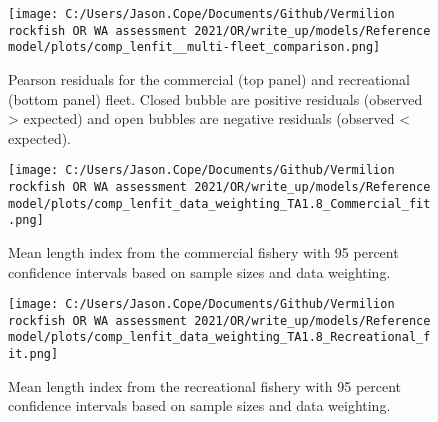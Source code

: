 \documentclass[11pt,
  english,
  a4paper,
]{article}
\begin{document}
\tagmcend\tagstructend


\begin{figure}
\centering
\texttt{[image: C:/Users/Jason.Cope/Documents/Github/Vermilion rockfish OR WA assessment 2021/OR/write\_up/models/Reference model/plots/comp\_lenfit\_\_multi-fleet\_comparison.png]}
\caption{Pearson residuals for the commercial (top panel) and recreational (bottom panel) fleet. Closed bubble are positive residuals (observed \textgreater{} expected) and open bubbles are negative residuals (observed \textless{} expected).\label{fig:com-rec-pearson}}
\end{figure}

\tagmcend\tagstructend


\begin{figure}
\centering
\texttt{[image: C:/Users/Jason.Cope/Documents/Github/Vermilion rockfish OR WA assessment 2021/OR/write\_up/models/Reference model/plots/comp\_lenfit\_data\_weighting\_TA1.8\_Commercial\_fit.png]}
\caption{Mean length index from the commercial fishery with 95 percent confidence intervals based on sample sizes and data weighting.\label{fig:com-mean-len-fit}}
\end{figure}

\tagmcend\tagstructend


\begin{figure}
\centering
\texttt{[image: C:/Users/Jason.Cope/Documents/Github/Vermilion rockfish OR WA assessment 2021/OR/write\_up/models/Reference model/plots/comp\_lenfit\_data\_weighting\_TA1.8\_Recreational\_fit.png]}
\caption{Mean length index from the recreational fishery with 95 percent confidence intervals based on sample sizes and data weighting.\label{fig:rec-mean-len-fit}}
\end{figure}
\end{document}
